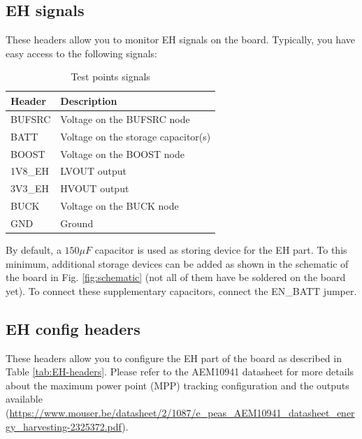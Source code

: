 \subsection{EH signals}

These headers allow you to monitor EH signals on the board. Typically, you have easy access to the following signals:

\begin{table}[h!]
    \centering
    \begin{tabular}{l l }
         \textbf{Header} & \textbf{Description} \\
         \toprule
         BUFSRC & Voltage on the BUFSRC node \\
         BATT & Voltage on the storage capacitor(s) \\
         BOOST & Voltage on the BOOST node \\
         1V8\_EH & LVOUT output \\
         3V3\_EH & HVOUT output \\
         BUCK & Voltage on the BUCK node \\
         GND & Ground
    \end{tabular}
    \caption{Test points signals}
    \label{tab:TP-signals}
\end{table}

By default, a $150 \mu F$ capacitor is used as storing device for the EH part. To this minimum, additional storage devices can be added as shown in the schematic of the board in Fig. \ref{fig:schematic} (not all of them have be soldered on the board yet). To connect these supplementary capacitors, connect the EN\_BATT jumper.

\subsection{EH config headers}

These headers allow you to configure the EH part of the board as described in Table \ref{tab:EH-headers}. Please refer to the AEM10941 datasheet for more details about the maximum power point (MPP) tracking configuration and the outputs available (\url{https://www.mouser.be/datasheet/2/1087/e_peas_AEM10941_datasheet_energy_harvesting-2325372.pdf}).

